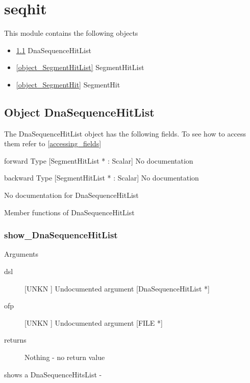 \section{seqhit}
\label{module_seqhit}
This module contains the following objects

\begin{itemize}
\item \ref{object_DnaSequenceHitList} DnaSequenceHitList

\item \ref{object_SegmentHitList} SegmentHitList

\item \ref{object_SegmentHit} SegmentHit

\end{itemize}
\subsection{Object DnaSequenceHitList}

\label{object_DnaSequenceHitList}

The DnaSequenceHitList object has the following fields. To see how to access them refer to \ref{accessing_fields}
\begin{description}
\item{forward} Type [SegmentHitList * : Scalar] No documentation

\item{backward} Type [SegmentHitList * : Scalar] No documentation

\end{description}
No documentation for DnaSequenceHitList

Member functions of DnaSequenceHitList

\subsubsection{show_DnaSequenceHitList}

Arguments
\begin{description}
\item[dsl] [UNKN ] Undocumented argument [DnaSequenceHitList *]
\item[ofp] [UNKN ] Undocumented argument [FILE *]
\item[returns] Nothing - no return value
\end{description}
shows a DnaSequenceHitsList -


